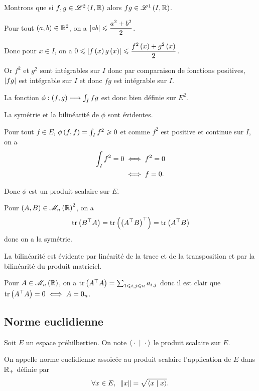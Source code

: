 \begin{dem}[5]
Montrons que si \(f,g\in\integ{2}{I}{\R}\) alors \(fg\in\integ{1}{I}{\R}\).

Pour tout \(\left(a,b\right)\in\mathbb{R}^2\), on a \(\left\lvert ab\right\rvert\leqslant\dfrac{a^2+b^2}{2}\).

Donc pour \(x\in I\), on a \(0\leqslant\left\lvert f\left(x\right)g\left(x\right)\right\rvert\leqslant\dfrac{f^2\left(x\right)+g^2\left(x\right)}{2}\).

Or \(f^2\) et \(g^2\) sont intégrables sur \(I\) donc par comparaison de fonctions positives, \(\left\lvert fg\right\rvert\) est intégrable sur \(I\) et donc \(fg\) est intégrable sur \(I\).

La fonction \(\phi:\left(f,g\right)\longmapsto\int_Ifg\) est donc bien définie sur \(E^2\).

La symétrie et la bilinéarité de \(\phi\) sont évidentes.

Pour tout \(f\in E\), \(\phi\left(f,f\right)=\int_If^2\geqslant0\) et comme \(f^2\) est positive et continue sur \(I\), on a \[\begin{aligned}
\int_If^2=0&\iff f^2=0 \\
&\iff f=0.
\end{aligned}\]

Donc \(\phi\) est un produit scalaire sur \(E\).
\end{dem}

\begin{dem}[6]
Pour \(\paren{A,B}\in\M{n}[\R]^2\), on a \[\operatorname{tr}\left(B^{\top}A\right)=\operatorname{tr}\left(\left(A^{\top}B\right)^{\top}\right)=\operatorname{tr}\left(A^{\top}B\right)\] donc on a la symétrie.

La bilinéarité est évidente par linéarité de la trace et de la transposition et par la bilinéarité du produit matriciel.

Pour \(A\in\M{n}[\R]\), on a \(\operatorname{tr}\left(A^{\top}A\right)=\sum_{1\leqslant i,j\leqslant n}a_{i,j}\) donc il est clair que \(\operatorname{tr}\left(A^{\top}A\right)=0\iff A=0_n\).
\end{dem}

\subsection{Norme euclidienne}

\begin{defi}
Soit \(E\) un espace préhilbertien. On note \(\ps{}{}\) le produit scalaire sur \(E\).

On appelle norme euclidienne assoicée au produit scalaire l'application de \(E\) dans \(\mathbb{R}_+\) définie par \[\quantifs{\forall x\in E}\norme{x}=\sqrt{\ps{x}{x}}.\]
\end{defi}

